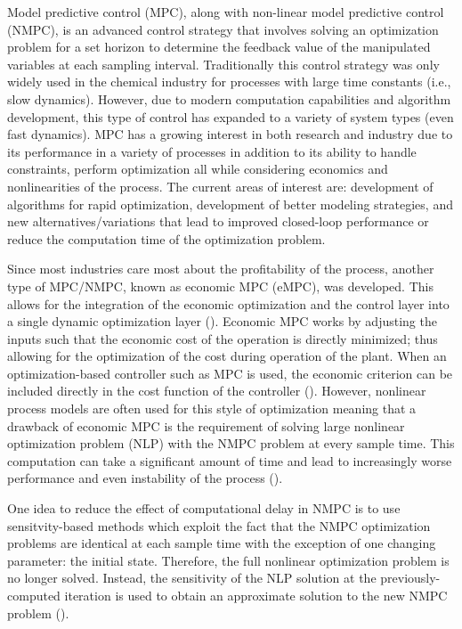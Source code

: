 Model predictive control (MPC), along with non-linear model predictive control (NMPC), is an advanced control strategy that involves solving an optimization problem for a set horizon to determine the feedback value of the manipulated variables at each sampling interval.
Traditionally this control strategy was only widely used in the chemical industry for processes with large time constants (i.e., slow dynamics).
However, due to modern computation capabilities and algorithm development, this type of control has expanded to a variety of system types (even fast dynamics).
MPC has a growing interest in both research and industry due to its performance in a variety of processes in addition to its ability to handle constraints, perform optimization all while considering economics and nonlinearities of the process.
The current areas of interest are: development of algorithms for rapid optimization, development of better modeling strategies, and new alternatives/variations that lead to improved closed-loop performance or reduce the computation time of the optimization problem.
\par
Since most industries care most about the profitability of the process, another type of MPC/NMPC, known as economic MPC (eMPC), was developed.
This allows for the integration of the economic optimization and the control layer into a single dynamic optimization layer (\cite{economic}).
Economic MPC works by adjusting the inputs such that the economic cost of the operation is directly minimized; thus allowing for the optimization of the cost during operation of the plant.
When an optimization-based controller such as MPC is used, the economic criterion can be included directly in the cost function of the controller (\cite{fast}).
However, nonlinear process models are often used for this style of optimization meaning that a drawback of economic MPC is the requirement of solving large nonlinear optimization problem (NLP) with the NMPC problem at every sample time.
This computation can take a significant amount of time and lead to increasingly worse performance and even instability of the process (\cite{economic}).
\par
One idea to reduce the effect of computational delay in NMPC is to use sensitvity-based methods which exploit the fact that the NMPC optimization problems are identical at each sample time with the exception of one changing parameter: the initial state.
Therefore, the full nonlinear optimization problem is no longer solved.
Instead, the sensitivity of the NLP solution at the previously-computed iteration is used to obtain an approximate solution to the new NMPC problem (\cite{economic}).
